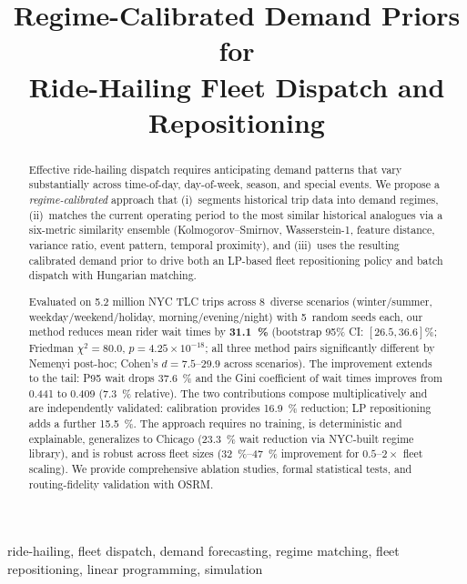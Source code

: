 \documentclass[conference,10pt]{IEEEtran}
\title{Regime-Calibrated Demand Priors for\\Ride-Hailing Fleet Dispatch and Repositioning}
\author{
  \IEEEauthorblockN{Indar Kumar}
  \IEEEauthorblockA{Independent Researcher\\
    \texttt{github.com/IndarKarhana}}
  \and
  \IEEEauthorblockN{Akanksha Tiwari}
  \IEEEauthorblockA{Independent Researcher}
}
\begin{document}
\maketitle

\begin{abstract}
Effective ride-hailing dispatch requires anticipating demand patterns that vary
substantially across time-of-day, day-of-week, season, and special events.
We propose a \emph{regime-calibrated} approach that (i)~segments historical
trip data into demand regimes, (ii)~matches the current operating period to
the most similar historical analogues via a six-metric similarity ensemble
(Kolmogorov--Smirnov, Wasserstein-1, feature distance, variance ratio, event
pattern, temporal proximity), and (iii)~uses the resulting calibrated demand
prior to drive both an LP-based fleet repositioning policy and batch dispatch
with Hungarian matching.

Evaluated on \num{5.2} million NYC TLC trips across 8~diverse scenarios
(winter/summer, weekday/weekend/holiday, morning/evening/night) with
5~random seeds each, our method reduces mean rider wait times by
\textbf{\SI{31.1}{\percent}} (bootstrap 95\% CI:
$[26.5, 36.6]\%$; Friedman $\chi^2 = 80.0$, $p = 4.25 \times 10^{-18}$;
all three method pairs significantly different by Nemenyi post-hoc;
Cohen's $d = 7.5$--$29.9$ across scenarios). The improvement extends to the tail: P95 wait drops \SI{37.6}{\percent}
and the Gini coefficient of wait times improves from 0.441 to 0.409
(\SI{7.3}{\percent} relative). The two contributions compose
multiplicatively and are independently validated: calibration provides
\SI{16.9}{\percent} reduction; LP repositioning adds a further
\SI{15.5}{\percent}. The approach requires no training, is
deterministic and explainable, generalizes to Chicago (\SI{23.3}{\percent}
wait reduction via NYC-built regime library), and is robust across fleet
sizes (\SIrange{32}{47}{\percent} improvement for $0.5$--$2\times$ fleet
scaling). We provide comprehensive ablation studies, formal statistical
tests, and routing-fidelity validation with OSRM.
\end{abstract}

\begin{IEEEkeywords}
ride-hailing, fleet dispatch, demand forecasting, regime matching,
fleet repositioning, linear programming, simulation
\end{IEEEkeywords}
\end{document}
